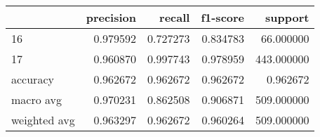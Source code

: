\begin{tabular}{lrrrr}
\toprule
 & precision & recall & f1-score & support \\
\midrule
16 & 0.979592 & 0.727273 & 0.834783 & 66.000000 \\
17 & 0.960870 & 0.997743 & 0.978959 & 443.000000 \\
accuracy & 0.962672 & 0.962672 & 0.962672 & 0.962672 \\
macro avg & 0.970231 & 0.862508 & 0.906871 & 509.000000 \\
weighted avg & 0.963297 & 0.962672 & 0.960264 & 509.000000 \\
\bottomrule
\end{tabular}
